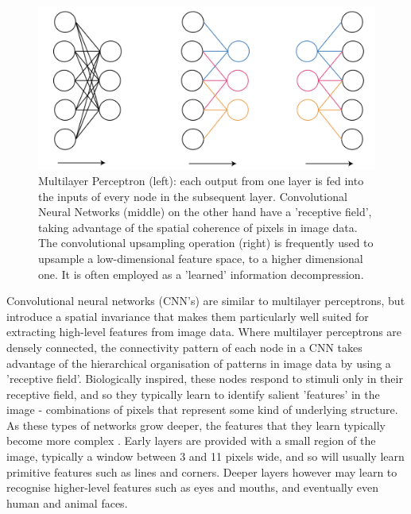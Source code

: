 \begin{figure}[tbp]
    \centering
    \includegraphics[width=5in]{images/cnnvsmlp.png}
    
    \caption{Multilayer Perceptron (left): each output from one layer is fed into the inputs of every node in the subsequent layer. Convolutional Neural Networks (middle) on the other hand have a 'receptive field', taking advantage of the spatial coherence of pixels in image data. The convolutional upsampling operation (right) is frequently used to upsample a low-dimensional feature space, to a higher dimensional one. It is often employed as a 'learned' information decompression.}
    
    \label{convexhull}
\end{figure}


Convolutional neural networks (CNN's) are similar to multilayer perceptrons, but introduce a spatial invariance that makes them particularly well suited for extracting high-level features from image data. Where multilayer perceptrons are densely connected, the connectivity pattern of each node in a CNN takes advantage of the hierarchical organisation of patterns in image data by using a 'receptive field'. Biologically inspired, these nodes respond to stimuli only in their receptive field, and so they typically learn to identify salient 'features' in the image - combinations of pixels that represent some kind of underlying structure. As these types of networks grow deeper, the features that they learn typically become more complex \cite{lecun1989cnn}. Early layers are provided with a small region of the image, typically a window between 3 and 11 pixels wide, and so will usually learn primitive features such as lines and corners. Deeper layers however may learn to recognise higher-level features such as eyes and mouths, and eventually even human and animal faces.



